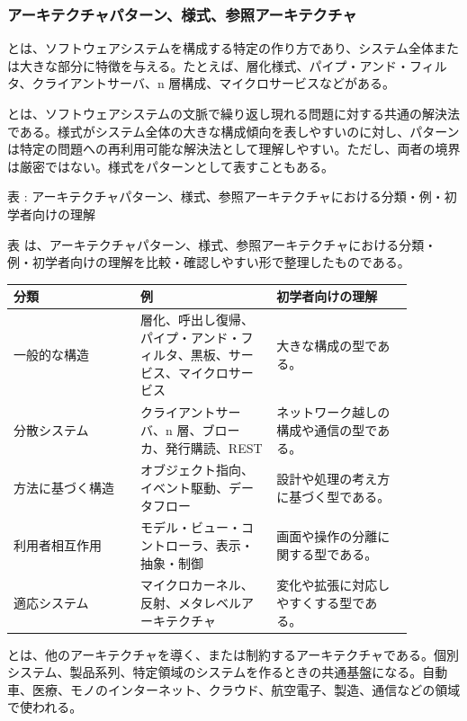 \subsubsection{アーキテクチャパターン、様式、参照アーキテクチャ}
とは、ソフトウェアシステムを構成する特定の作り方であり、システム全体または大きな部分に特徴を与える。たとえば、層化様式、パイプ・アンド・フィルタ、クライアントサーバ、n 層構成、マイクロサービスなどがある。

とは、ソフトウェアシステムの文脈で繰り返し現れる問題に対する共通の解決法である。様式がシステム全体の大きな構成傾向を表しやすいのに対し、パターンは特定の問題への再利用可能な解決法として理解しやすい。ただし、両者の境界は厳密ではない。様式をパターンとして表すこともある。

\par\smallskip\noindent{}\label{tab:ch02-04}表 \thetable: アーキテクチャパターン、様式、参照アーキテクチャにおける分類・例・初学者向けの理解\par\smallskip
表 \thetable は、アーキテクチャパターン、様式、参照アーキテクチャにおける分類・例・初学者向けの理解を比較・確認しやすい形で整理したものである。\par\smallskip
\begin{longtable}{P{0.28\linewidth}P{0.30\linewidth}P{0.30\linewidth}}
\toprule
分類 & 例 & 初学者向けの理解 \\
\midrule
一般的な構造 & 層化、呼出し復帰、パイプ・アンド・フィルタ、黒板、サービス、マイクロサービス & 大きな構成の型である。 \\
分散システム & クライアントサーバ、n 層、ブローカ、発行購読、REST & ネットワーク越しの構成や通信の型である。 \\
方法に基づく構造 & オブジェクト指向、イベント駆動、データフロー & 設計や処理の考え方に基づく型である。 \\
利用者相互作用 & モデル・ビュー・コントローラ、表示・抽象・制御 & 画面や操作の分離に関する型である。 \\
適応システム & マイクロカーネル、反射、メタレベルアーキテクチャ & 変化や拡張に対応しやすくする型である。 \\
\bottomrule
\end{longtable}

とは、他のアーキテクチャを導く、または制約するアーキテクチャである。個別システム、製品系列、特定領域のシステムを作るときの共通基盤になる。自動車、医療、モノのインターネット、クラウド、航空電子、製造、通信などの領域で使われる。

